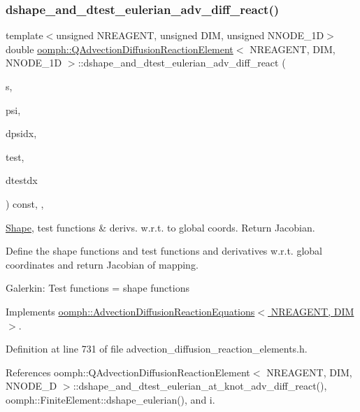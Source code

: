 \subsubsection{\texorpdfstring{dshape\+\_\+and\+\_\+dtest\+\_\+eulerian\+\_\+adv\+\_\+diff\+\_\+react()}{dshape\_and\_dtest\_eulerian\_adv\_diff\_react()}}
{\footnotesize\ttfamily template$<$unsigned N\+R\+E\+A\+G\+E\+NT, unsigned D\+IM, unsigned N\+N\+O\+D\+E\+\_\+1D$>$ \\
double \hyperlink{classoomph_1_1QAdvectionDiffusionReactionElement}{oomph\+::\+Q\+Advection\+Diffusion\+Reaction\+Element}$<$ N\+R\+E\+A\+G\+E\+NT, D\+IM, N\+N\+O\+D\+E\+\_\+1D $>$\+::dshape\+\_\+and\+\_\+dtest\+\_\+eulerian\+\_\+adv\+\_\+diff\+\_\+react (\begin{DoxyParamCaption}\item[{const \hyperlink{classoomph_1_1Vector}{Vector}$<$ double $>$ \&}]{s,  }\item[{\hyperlink{classoomph_1_1Shape}{Shape} \&}]{psi,  }\item[{\hyperlink{classoomph_1_1DShape}{D\+Shape} \&}]{dpsidx,  }\item[{\hyperlink{classoomph_1_1Shape}{Shape} \&}]{test,  }\item[{\hyperlink{classoomph_1_1DShape}{D\+Shape} \&}]{dtestdx }\end{DoxyParamCaption}) const\hspace{0.3cm}{\ttfamily [inline]}, {\ttfamily [protected]}, {\ttfamily [virtual]}}



\hyperlink{classoomph_1_1Shape}{Shape}, test functions \& derivs. w.\+r.\+t. to global coords. Return Jacobian. 

Define the shape functions and test functions and derivatives w.\+r.\+t. global coordinates and return Jacobian of mapping.

Galerkin\+: Test functions = shape functions 

Implements \hyperlink{classoomph_1_1AdvectionDiffusionReactionEquations_a227bda2d1384aaa46dff37ccd370e6d6}{oomph\+::\+Advection\+Diffusion\+Reaction\+Equations$<$ N\+R\+E\+A\+G\+E\+N\+T, D\+I\+M $>$}.



Definition at line 731 of file advection\+\_\+diffusion\+\_\+reaction\+\_\+elements.\+h.



References oomph\+::\+Q\+Advection\+Diffusion\+Reaction\+Element$<$ N\+R\+E\+A\+G\+E\+N\+T, D\+I\+M, N\+N\+O\+D\+E\+\_\+D $>$\+::dshape\+\_\+and\+\_\+dtest\+\_\+eulerian\+\_\+at\+\_\+knot\+\_\+adv\+\_\+diff\+\_\+react(), oomph\+::\+Finite\+Element\+::dshape\+\_\+eulerian(), and i.



